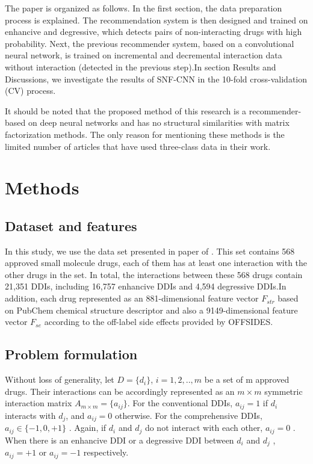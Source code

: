 \documentclass{bmcart}
\begin{document}
The paper is organized as follows. In the first section, the data preparation process is explained. The recommendation system is then designed and trained on enhancive and degressive, which detects pairs of non-interacting drugs with high probability. Next, the previous recommender system, based on a convolutional neural network, is trained on incremental and decremental interaction data without interaction (detected in the previous step).In section Results and Discussions, we investigate the results of SNF-CNN in the 10-fold cross-validation (CV) process.

It should be noted that the proposed method of this research is a recommender-based on deep neural networks and has no structural similarities with matrix factorization methods. The only reason for mentioning these methods is the limited number of articles that have used three-class data in their work.

\section*{Methods}
\subsection*{Dataset and features}
In this study, we use the data set presented in paper of \cite{yu2018predicting}. This set contains 568 approved small molecule drugs, each of them has at least one interaction with the other drugs in the set. In total, the interactions between these 568 drugs contain 21,351 DDIs, including 16,757 enhancive DDIs and 4,594 degressive DDIs.In addition, each drug represented as an  881-dimensional feature vector $ F_ {str} $  based on PubChem chemical structure descriptor and also a 9149-dimensional feature vector $ F_ {se} $ according to the off-label side effects provided by OFFSIDES.

\subsection*{Problem formulation}

Without loss of generality, let $D = \{d_i\}$, $i = 1, 2, .., m$ be a set of m approved drugs. Their  interactions can be accordingly represented as an $m \times m$ symmetric interaction matrix $A_{m \times m} = \{a_{ij}\}$. For the conventional DDIs, $a_{ij} = 1$ if $d_i$ interacts with $d_j$, and $a_{ij} = 0$ otherwise. For the comprehensive DDIs, $a_{ij} \in \{-1, 0, +1\}$ . Again, if $d_i$ and $d_j$ do not interact with each other, $a_{ij} = 0$ . When there is an enhancive DDI or a degressive DDI between $d_i$ and $d_j$ , $a_{ij} = +1$ or $a_{ij} = -1$ respectively.
\end{document}
